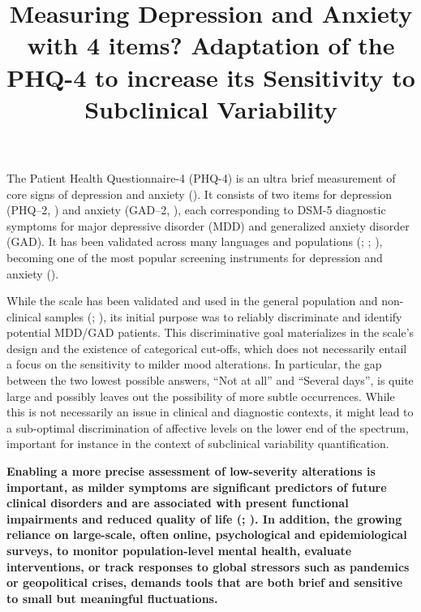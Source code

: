 \documentclass[
  jou,
  longtable,
  nolmodern,
  notxfonts,
  notimes,
  mask,
  colorlinks=true,linkcolor=blue,citecolor=blue,urlcolor=blue]{apa7}
\title{\textbf{Measuring Depression and Anxiety with 4 items? Adaptation
of the PHQ-4 to increase its Sensitivity to Subclinical Variability}}
\begin{document}
\maketitle


\setcounter{secnumdepth}{-\maxdimen} %

\setlength\LTleft{0pt}

\resetlinenumber[1]

The Patient Health Questionnaire-4 (PHQ-4) is an ultra brief measurement
of core signs of depression and anxiety
(). It consists of
two items for depression (PHQ--2,
) and anxiety
(GAD--2, ), each
corresponding to DSM-5 diagnostic symptoms for major depressive disorder
(MDD) and generalized anxiety disorder (GAD). It has been validated
across many languages and populations
(; ;
), becoming one of
the most popular screening instruments for depression and anxiety
().

While the scale has been validated and used in the general population
and non-clinical samples (; ), its initial
purpose was to reliably discriminate and identify potential MDD/GAD
patients. This discriminative goal materializes in the scale's design
and the existence of categorical cut-offs, which does not necessarily
entail a focus on the sensitivity to milder mood alterations. In
particular, the gap between the two lowest possible answers, ``Not at
all'' and ``Several days'', is quite large and possibly leaves out the
possibility of more subtle occurrences. While this is not necessarily an
issue in clinical and diagnostic contexts, it might lead to a
sub-optimal discrimination of affective levels on the lower end of the
spectrum, important for instance in the context of subclinical
variability quantification.

\textbf{Enabling a more precise assessment of low-severity alterations
is important, as milder symptoms are significant predictors of future
clinical disorders and are associated with present functional
impairments and reduced quality of life
(;
). In addition, the
growing reliance on large-scale, often online, psychological and
epidemiological surveys, to monitor population-level mental health,
evaluate interventions, or track responses to global stressors such as
pandemics or geopolitical crises, demands tools that are both brief and
sensitive to small but meaningful fluctuations.}
\end{document}

